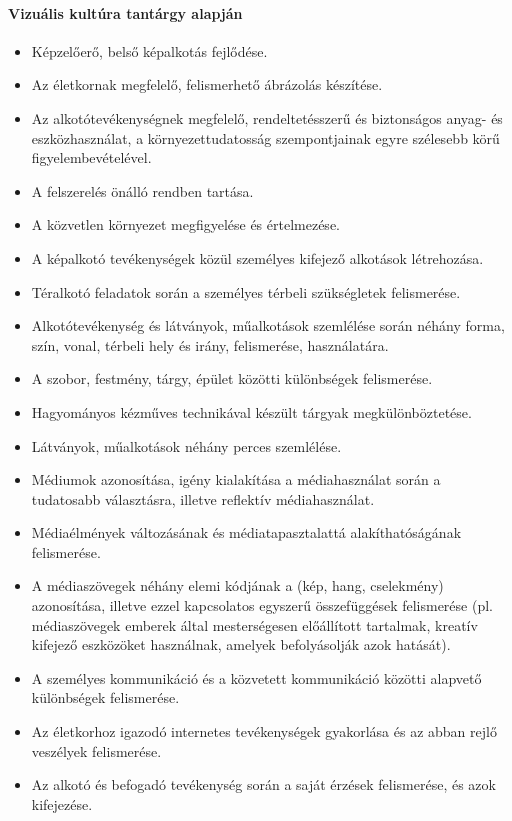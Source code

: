 \paragraph{Vizuális kultúra tantárgy alapján}
\begin{itemize}
\item Képzelőerő, belső képalkotás fejlődése.
\item Az életkornak megfelelő, felismerhető ábrázolás készítése.
\item Az alkotótevékenységnek megfelelő, rendeltetésszerű és biztonságos anyag- és eszközhasználat, a környezettudatosság szempontjainak egyre szélesebb körű figyelembevételével.
\item A felszerelés önálló rendben tartása.
\item A közvetlen környezet megfigyelése és értelmezése.
\item A képalkotó tevékenységek közül személyes kifejező alkotások létrehozása.
\item Téralkotó feladatok során a személyes térbeli szükségletek felismerése.
\item Alkotótevékenység és látványok, műalkotások szemlélése során néhány forma, szín, vonal, térbeli hely és irány, felismerése, használatára.
\item A szobor, festmény, tárgy, épület közötti különbségek felismerése.
\item Hagyományos kézműves technikával készült tárgyak megkülönböztetése.
\item Látványok, műalkotások néhány perces szemlélése.
\item Médiumok azonosítása, igény kialakítása a médiahasználat során a tudatosabb választásra, illetve reflektív médiahasználat.
\item Médiaélmények változásának és médiatapasztalattá alakíthatóságának felismerése.
\item A médiaszövegek néhány elemi kódjának a (kép, hang, cselekmény) azonosítása, illetve ezzel kapcsolatos egyszerű összefüggések felismerése (pl. médiaszövegek emberek által mesterségesen előállított tartalmak, kreatív kifejező eszközöket használnak, amelyek befolyásolják azok hatását).
\item A személyes kommunikáció és a közvetett kommunikáció közötti alapvető különbségek felismerése.
\item Az életkorhoz igazodó internetes tevékenységek gyakorlása és az abban rejlő veszélyek felismerése.
\item Az alkotó és befogadó tevékenység során a saját érzések felismerése, és azok kifejezése.
\end{itemize}
